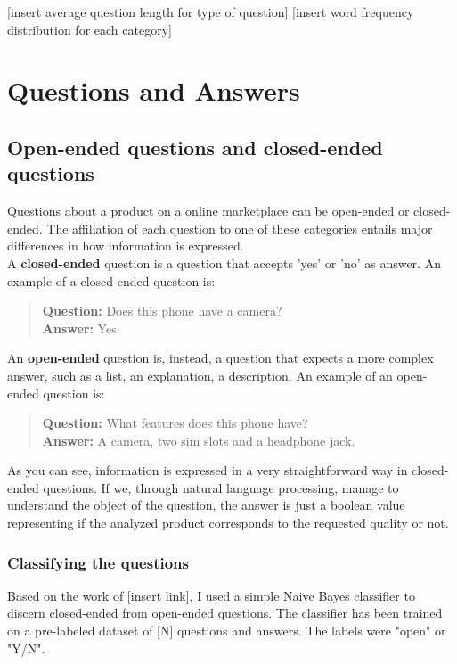 \documentclass[LaM,binding=0.6cm]{sapthesis}
\begin{document}
[insert average question length for type of question]
[insert word frequency distribution for each category]

\section{Questions and Answers}

\subsection{Open-ended questions and closed-ended questions}

Questions about a product on a online marketplace can be open-ended or closed-ended. The affiliation of each question to one of these categories entails major differences in how information is expressed. \\

A \textbf{closed-ended} question is a question that accepts 'yes' or 'no' as answer. An example of a closed-ended question is:
\begin{quote}
\textbf{Question:} Does this phone have a camera? \\
\textbf{Answer:} Yes.
\end{quote} 

An \textbf{open-ended} question is, instead, a question that expects a more complex answer, such as a list, an explanation, a description. An example of an open-ended question is:
\begin{quote}
\textbf{Question:} What features does this phone have? \\
\textbf{Answer:} A camera, two sim slots and a headphone jack.
\end{quote}

As you can see, information is expressed in a very straightforward way in closed-ended questions. If we, through natural language processing, manage to understand the object of the question, the answer is just a boolean value representing if the analyzed product corresponds to the requested quality or not.

\subsubsection{Classifying the questions}
Based on the work of [insert link], I used a simple Naive Bayes classifier to discern closed-ended from open-ended questions.
The classifier has been trained on a pre-labeled dataset of [N] questions and answers. The labels were "open" or "Y/N".
\end{document}
